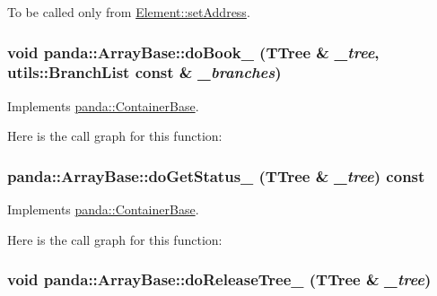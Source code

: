 To be called only from \hyperlink{classpanda_1_1Element_a0f4c9e587ee4c4ccbc27b76b06adbc80}{Element::setAddress}. \hypertarget{classpanda_1_1ArrayBase_aecb9d88c88e0102d7c8d631a036cb338}{
\subsubsection[{doBook\_\-}]{\setlength{\rightskip}{0pt plus 5cm}void panda::ArrayBase::doBook\_\- (TTree \& {\em \_\-tree}, \/  {\bf utils::BranchList} const \& {\em \_\-branches})}}
\label{classpanda_1_1ArrayBase_aecb9d88c88e0102d7c8d631a036cb338}


Implements \hyperlink{classpanda_1_1ContainerBase_acb14a3b21278b32716445c846017b664}{panda::ContainerBase}.

Here is the call graph for this function:\hypertarget{classpanda_1_1ArrayBase_a945c9cf4d4a979891c11cdfca5e7241f}{
\subsubsection[{doGetStatus\_\-}]{ panda::ArrayBase::doGetStatus\_\- (TTree \& {\em \_\-tree}) const}}
\label{classpanda_1_1ArrayBase_a945c9cf4d4a979891c11cdfca5e7241f}


Implements \hyperlink{classpanda_1_1ContainerBase_a6aa05603a5aff914a56681ab70b01b4e}{panda::ContainerBase}.

Here is the call graph for this function:\hypertarget{classpanda_1_1ArrayBase_a4fecec0749650b43c4eb3110e60fa193}{
\subsubsection[{doReleaseTree\_\-}]{\setlength{\rightskip}{0pt plus 5cm}void panda::ArrayBase::doReleaseTree\_\- (TTree \& {\em \_\-tree})}}
\label{classpanda_1_1ArrayBase_a4fecec0749650b43c4eb3110e60fa193}


